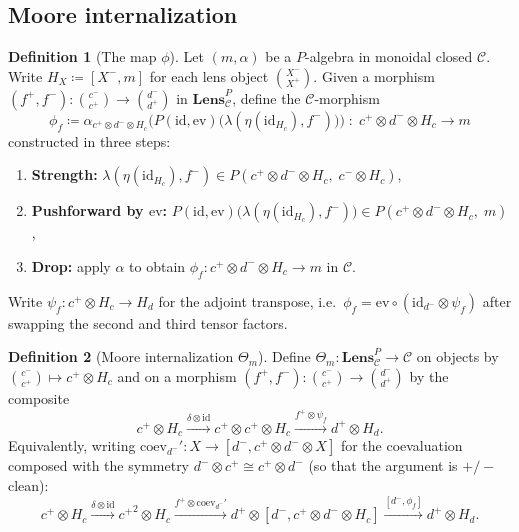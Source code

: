 \documentclass[11pt]{article}
\theoremstyle{definition}
\newtheorem{definition}{Definition}[section]
\newcommand{\id}{\mathrm{id}}
\newcommand{\outp}[1]{#1^{+}}
\newcommand{\inpt}[1]{#1^{-}}
\newcommand{\lensob}[1]{\binom{\inpt{#1}}{\outp{#1}}}
\newcommand{\cat}[1]{\mathcal{#1}}
\newcommand{\Cat}[1]{\mathbf{#1}}
\newcommand{\LensP}[2]{\Cat{Lens}_{#1}^{#2}}
\newcommand{\ev}{\mathrm{ev}}
\newcommand{\coev}{\mathrm{coev}}
\newcommand{\To}[1]{\xrightarrow{#1}}
\newcommand{\ihom}[2]{[#1,#2]}
\begin{document}
\subsection{Moore internalization}

\begin{definition}[The map $\phi$]\label{def.phi}
Let $(m,\alpha)$ be a $P$-algebra in monoidal closed $\cat{C}$. Write $H_X\coloneqq\ihom{\inpt{X}}{m}$ for each lens object $\lensob{X}$. Given a morphism $(\outp{f},\inpt{f})\colon\lensob{c}\to\lensob{d}$ in $\LensP{\cat{C}}{P}$, define the $\cat{C}$-morphism
\begin{equation}\label{eqn.phi}
\phi_f\coloneqq\alpha_{\outp{c}\otimes\inpt{d}\otimes H_c}\bigl(P(\id,\ev)\bigl(\lambda(\eta(\id_{H_c}),\inpt{f})\bigr)\bigr)\;\colon\;\outp{c}\otimes\inpt{d}\otimes H_c\to m
\end{equation}
constructed in three steps:
\begin{enumerate}
\item \textbf{Strength:} $\lambda(\eta(\id_{H_c}),\inpt{f})\in P(\outp{c}\otimes\inpt{d}\otimes H_c,\;\inpt{c}\otimes H_c)$,
\item \textbf{Pushforward by $\ev$:} $P(\id,\ev)\bigl(\lambda(\eta(\id_{H_c}),\inpt{f})\bigr)\in P(\outp{c}\otimes\inpt{d}\otimes H_c,\;m)$,
\item \textbf{Drop:} apply $\alpha$ to obtain $\phi_f\colon\outp{c}\otimes\inpt{d}\otimes H_c\to m$ in $\cat{C}$.
\end{enumerate}
Write $\psi_f\colon\outp{c}\otimes H_c\to H_d$ for the adjoint transpose, i.e.\ $\phi_f=\ev\circ(\id_{\inpt{d}}\otimes\psi_f)$ after swapping the second and third tensor factors.
\end{definition}

\begin{definition}[Moore internalization $\Theta_m$]\label{def.Theta}
Define $\Theta_m\colon\LensP{\cat{C}}{P}\to\cat{C}$ on objects by $\lensob{c}\mapsto\outp{c}\otimes H_c$ and on a morphism $(\outp{f},\inpt{f})\colon\lensob{c}\to\lensob{d}$ by the composite
\begin{equation}\label{eqn.Theta_mor}
\outp{c}\otimes H_c\To{\delta\otimes\id}\outp{c}\otimes\outp{c}\otimes H_c\To{\outp{f}\otimes\psi_f}\outp{d}\otimes H_d.
\end{equation}
Equivalently, writing $\coev_{\inpt{d}}'\colon X\to\ihom{\inpt{d}}{\outp{c}\otimes\inpt{d}\otimes X}$ for the coevaluation composed with the symmetry $\inpt{d}\otimes\outp{c}\cong\outp{c}\otimes\inpt{d}$ (so that the argument is $+/-$ clean):
\begin{equation}\label{eqn.Theta_chain}
\outp{c}\otimes H_c\To{\delta\otimes\id}{\outp{c}}^2\otimes H_c\To{\outp{f}\otimes\coev_{\inpt{d}}'}\outp{d}\otimes\ihom{\inpt{d}}{\outp{c}\otimes\inpt{d}\otimes H_c}\To{\ihom{\inpt{d}}{\phi_f}}\outp{d}\otimes H_d.
\end{equation}
\end{definition}
\end{document}
